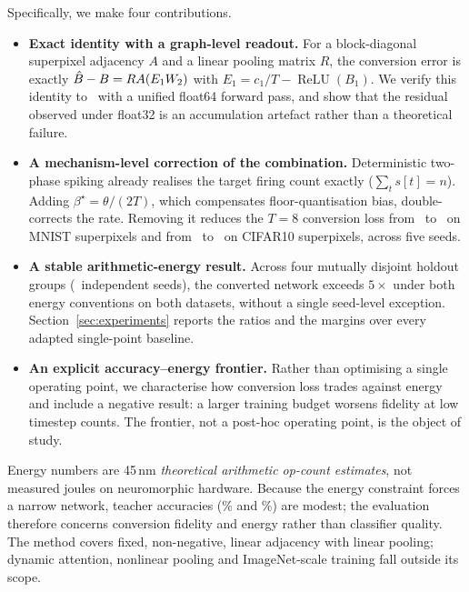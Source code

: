 Specifically, we make four contributions.

\begin{itemize}
\item \textbf{Exact identity with a graph-level readout.} For a block-diagonal superpixel adjacency $A$ and a linear pooling matrix $R$, the conversion error is exactly $\hat{B}-B = R A (E_1 W_2)$ with $E_1 = c_1/T - \operatorname{ReLU}(B_1)$. We verify this identity to \IdentityMax\ with a unified float64 forward pass, and show that the residual observed under float32 is an accumulation artefact rather than a theoretical failure.
\item \textbf{A mechanism-level correction of the combination.} Deterministic two-phase spiking already realises the target firing count exactly ($\sum_t s[t]=n$). Adding $\beta^\star=\theta/(2T)$, which compensates floor-quantisation bias, double-corrects the rate. Removing it reduces the $T{=}8$ conversion loss from \BetaLossVoneM\ to \BetaLossVtwoM\ on MNIST superpixels and from \BetaLossVoneC\ to \BetaLossVtwoC\ on CIFAR10 superpixels, across five seeds.
\item \textbf{A stable arithmetic-energy result.} Across four mutually disjoint holdout groups (\TotalSeeds\ independent seeds), the converted network exceeds $5\times$ under both energy conventions on both datasets, without a single seed-level exception. Section~\ref{sec:experiments} reports the ratios and the margins over every adapted single-point baseline.
\item \textbf{An explicit accuracy--energy frontier.} Rather than optimising a single operating point, we characterise how conversion loss trades against energy and include a negative result: a larger training budget worsens fidelity at low timestep counts. The frontier, not a post-hoc operating point, is the object of study.
\end{itemize}

Energy numbers are 45\,nm \emph{theoretical arithmetic op-count estimates}, not measured joules on neuromorphic hardware. Because the energy constraint forces a narrow network, teacher accuracies (\MNISTAnn\% and \CIFARAnn\%) are modest; the evaluation therefore concerns conversion fidelity and energy rather than classifier quality. The method covers fixed, non-negative, linear adjacency with linear pooling; dynamic attention, nonlinear pooling and ImageNet-scale training fall outside its scope.
